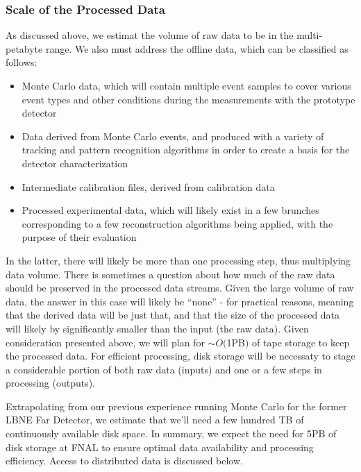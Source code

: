 \subsubsection{Scale of the Processed Data}
As discussed above, we estimat the volume of raw data to be in the multi-petabyte range. We also must address the offline data, which can be classified as follows:
\begin{itemize}
\item Monte Carlo data, which will contain multiple event samples to cover various event types and other conditions during the measurements with the prototype detector
\item Data derived from Monte Carlo events, and produced with a variety of tracking and pattern recognition algorithms in order to create a basis for the detector characterization
\item Intermediate calibration files, derived from calibration data
\item Processed experimental data, which will likely exist in a few brunches corresponding to a few reconstruction algorithms being applied, with the purpose of their evaluation
\end{itemize}

In the latter, there will likely be more than one processing step, thus multiplying data volume. There is sometimes a question
about how much of the raw data should be preserved in the processed data streams.
Given the large volume of raw data, the answer in this case will likely be ``none'' - for practical reasons, meaning that the derived data will
be just that, and that the size of the processed data will likely by significantly smaller than the input (the raw data). Given consideration presented above, we will plan for
$\sim$$ O($1PB$)$ of tape storage to keep the processed data. For efficient processing, disk storage will be necessaty
to stage a considerable portion of both raw data (inputs) and one or a few steps in processing (outputs).

Extrapolating from our previous experience running Monte Carlo for the former LBNE Far Detector, we estimate that we'll need a few hundred TB of continuously available
disk space. In summary, we expect the need for 5PB of disk storage at FNAL to ensure optimal data availability and processing efficiency.
Access to distributed data is discussed below.

